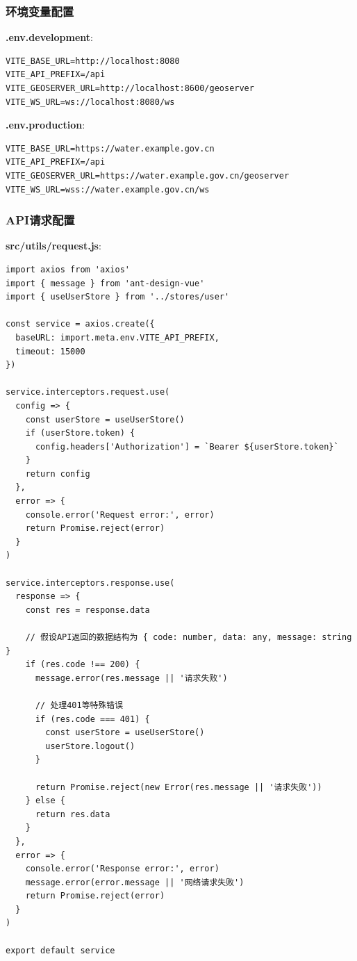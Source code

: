 \subsubsection{环境变量配置}\label{ux73afux5883ux53d8ux91cfux914dux7f6e}

\textbf{.env.development}:

\begin{lstlisting}
VITE_BASE_URL=http://localhost:8080
VITE_API_PREFIX=/api
VITE_GEOSERVER_URL=http://localhost:8600/geoserver
VITE_WS_URL=ws://localhost:8080/ws
\end{lstlisting}

\textbf{.env.production}:

\begin{lstlisting}
VITE_BASE_URL=https://water.example.gov.cn
VITE_API_PREFIX=/api
VITE_GEOSERVER_URL=https://water.example.gov.cn/geoserver
VITE_WS_URL=wss://water.example.gov.cn/ws
\end{lstlisting}

\subsubsection{API请求配置}\label{apiux8bf7ux6c42ux914dux7f6e}

\textbf{src/utils/request.js}:

\begin{lstlisting}
import axios from 'axios'
import { message } from 'ant-design-vue'
import { useUserStore } from '../stores/user'

const service = axios.create({
  baseURL: import.meta.env.VITE_API_PREFIX,
  timeout: 15000
})

service.interceptors.request.use(
  config => {
    const userStore = useUserStore()
    if (userStore.token) {
      config.headers['Authorization'] = `Bearer ${userStore.token}`
    }
    return config
  },
  error => {
    console.error('Request error:', error)
    return Promise.reject(error)
  }
)

service.interceptors.response.use(
  response => {
    const res = response.data
    
    // 假设API返回的数据结构为 { code: number, data: any, message: string }
    if (res.code !== 200) {
      message.error(res.message || '请求失败')
      
      // 处理401等特殊错误
      if (res.code === 401) {
        const userStore = useUserStore()
        userStore.logout()
      }
      
      return Promise.reject(new Error(res.message || '请求失败'))
    } else {
      return res.data
    }
  },
  error => {
    console.error('Response error:', error)
    message.error(error.message || '网络请求失败')
    return Promise.reject(error)
  }
)

export default service
\end{lstlisting}

